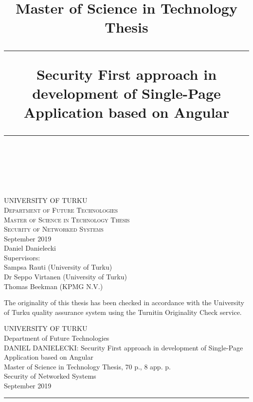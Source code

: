\documentclass{article} %
\title{Master of Science in Technology Thesis}
\title{
\rule{\linewidth}{2pt}
\huge Security First approach\index{Security!first approach} in development of Single-Page Application\index{Single-Page Application (SPA)} based on Angular\index{Angular}
\rule{\linewidth}{2pt}  \\[10pt]
}
\date{}
\begin{document}
\maketitle
\noindent
\break
\vspace*{\fill}
\begin{flushright}
\normalfont \normalsize 
\textsc{UNIVERSITY OF TURKU\\Department of Future Technologies\\Master of Science in Technology Thesis\\Security of Networked Systems}\\September 2019\\Daniel Danielecki\\ \vspace{2 mm} Supervisors:\\Sampsa Rauti (University of Turku)\\Dr Seppo Virtanen (University of Turku)\\Thomas Beekman (KPMG N.V.)
\end{flushright}
\small \centering The originality of this thesis has been checked in accordance with the University of Turku quality assurance system using the Turnitin Originality Check service.
\newpage
\thispagestyle{empty} %
\begin{flushleft}
UNIVERSITY OF TURKU\\
Department of Future Technologies\\
DANIEL DANIELECKI: Security First approach in development of Single-Page Application based on Angular\\
Master of Science in Technology Thesis, 70 p., 8 app. p.\\
Security of Networked Systems\\
September 2019
\end{flushleft}
\rule{\linewidth}{1pt}
\end{document}
